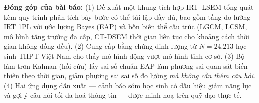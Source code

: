 \textbf{Đóng góp của bài báo:} (1) Đề xuất một khung tích hợp IRT--LSEM tổng quát kèm quy trình phân tích bảy bước có thể tái lập đầy đủ, bao gồm tầng đo lường IRT 1PL với ước lượng Bayes (EAP) và bốn biến thể cấu trúc (LGCM, LCSM, mô hình tăng trưởng đa cấp, CT-DSEM thời gian liên tục cho khoảng cách thời gian không đồng đều). (2) Cung cấp bằng chứng định lượng từ \(N = 24{.}213\) học sinh THPT Việt Nam cho thấy mô hình động vượt mô hình tĩnh cơ sở. (3) Bộ làm trơn Kalman (hồi cứu) lấy sai số chuẩn EAP làm phương sai quan sát biến thiên theo thời gian, giảm phương sai sai số đo lường \emph{mà không cần thêm câu hỏi}. (4) Hai ứng dụng dẫn xuất --- cảnh báo sớm học sinh có dấu hiệu giảm năng lực và gợi ý câu hỏi tối đa hoá thông tin --- được minh hoạ trên quỹ đạo thực tế.
